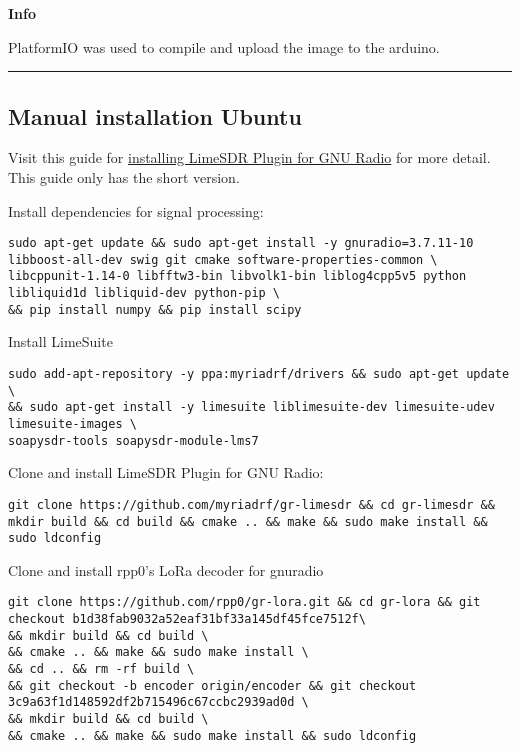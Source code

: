 \textbf{Info}

PlatformIO was used to compile and upload the image to the arduino.

\begin{center}\rule{0.5\linewidth}{\linethickness}\end{center}

\subsection{Manual installation
Ubuntu}\label{manual-installation-ubuntu}

Visit this guide for
\href{https://wiki.myriadrf.org/Gr-limesdr_Plugin_for_GNURadio}{installing
LimeSDR Plugin for GNU Radio} for more detail. This guide only has the
short version.

Install dependencies for signal processing:

\begin{verbatim}
sudo apt-get update && sudo apt-get install -y gnuradio=3.7.11-10 libboost-all-dev swig git cmake software-properties-common \
libcppunit-1.14-0 libfftw3-bin libvolk1-bin liblog4cpp5v5 python libliquid1d libliquid-dev python-pip \
&& pip install numpy && pip install scipy
\end{verbatim}

Install LimeSuite

\begin{verbatim}
sudo add-apt-repository -y ppa:myriadrf/drivers && sudo apt-get update \
&& sudo apt-get install -y limesuite liblimesuite-dev limesuite-udev limesuite-images \
soapysdr-tools soapysdr-module-lms7
\end{verbatim}

Clone and install LimeSDR Plugin for GNU Radio:

\begin{verbatim}
git clone https://github.com/myriadrf/gr-limesdr && cd gr-limesdr && mkdir build && cd build && cmake .. && make && sudo make install && sudo ldconfig
\end{verbatim}

Clone and install rpp0's LoRa decoder for gnuradio

\begin{verbatim}
git clone https://github.com/rpp0/gr-lora.git && cd gr-lora && git checkout b1d38fab9032a52eaf31bf33a145df45fce7512f\
&& mkdir build && cd build \
&& cmake .. && make && sudo make install \
&& cd .. && rm -rf build \
&& git checkout -b encoder origin/encoder && git checkout 3c9a63f1d148592df2b715496c67ccbc2939ad0d \
&& mkdir build && cd build \
&& cmake .. && make && sudo make install && sudo ldconfig
\end{verbatim}

